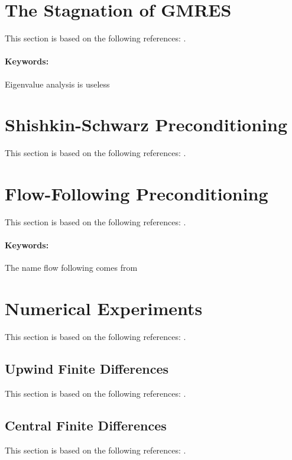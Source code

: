 \section{The Stagnation of GMRES}
This section is based on the following references: \cite{Gal13, GolVan13, HorJoh12, Saa03}.
\paragraph{Keywords:} Eigenvalue analysis is useless


\section{Shishkin-Schwarz Preconditioning}
This section is based on the following references: \cite{EchLieSzyTic18, KahKamPhi07}.


\section{Flow-Following Preconditioning}
This section is based on the following references: \cite{EchGarSet19, ElmSilWat14}.
\paragraph{Keywords:} The name flow following comes from \cite{AndKop96}


\section{Numerical Experiments}
This section is based on the following references: \cite{ElmSilWat14}.

\subsection{Upwind Finite Differences}
This section is based on the following references: \cite{EchLieSzyTic18, Smi85}.


\subsection{Central Finite Differences}
This section is based on the following references: \cite{EchLieSzyTic18, Smi85}.


\else

